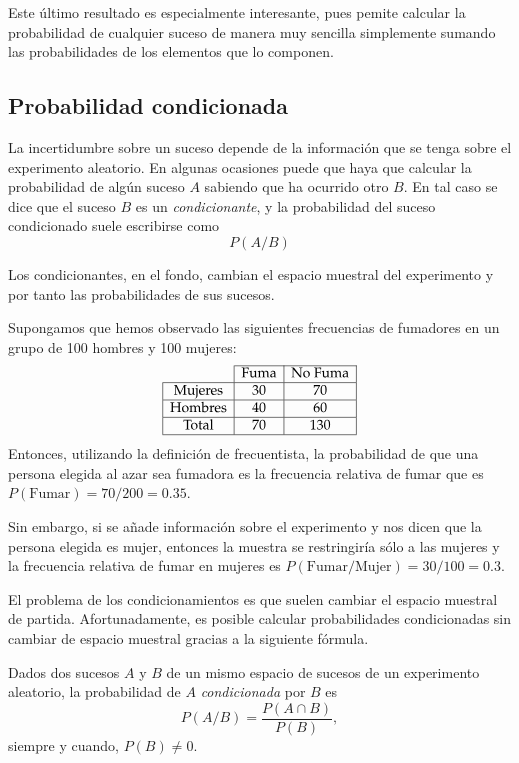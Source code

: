 Este último resultado es especialmente interesante, pues pemite calcular la probabilidad de cualquier suceso de manera muy sencilla
simplemente sumando las probabilidades de los elementos que lo componen. 

\subsection{Probabilidad condicionada}
La incertidumbre sobre un suceso depende de la información que se tenga sobre el experimento aleatorio. 
En algunas ocasiones puede que haya que calcular la probabilidad de algún suceso $A$ sabiendo que ha ocurrido otro $B$. 
En tal caso se dice que el suceso $B$ es un \emph{condicionante}, y la probabilidad del suceso condicionado suele escribirse como 
\[P(A/B)\]

Los condicionantes, en el fondo, cambian el espacio muestral del experimento y por tanto las probabilidades de sus sucesos.

\begin{ejemplo}
Supongamos que hemos observado las siguientes frecuencias de fumadores en un grupo de 100 hombres y 100 mujeres:
\[
\begin{array}{|c|c|c|}
\cline{2-3}
 \multicolumn{1}{c|}{} & \mbox{Fuma} & \mbox{No Fuma} \\ \hline 
 \mbox{Mujeres} & 30 & 70 \\ \hline
 \mbox{Hombres} & 40 & 60 \\ \hline
 \mbox{Total} & 70 & 130 \\ \hline
\end{array}
\]
Entonces, utilizando la definición de frecuentista, la probabilidad de que una persona elegida al azar sea fumadora es
la frecuencia relativa de fumar que es $P(\mbox{Fumar})= 70/200=0.35$.

Sin embargo, si se añade información sobre el experimento y nos dicen que la persona elegida es mujer, entonces la muestra se restringiría
sólo a las mujeres y la frecuencia relativa de fumar en mujeres es $P(\mbox{Fumar}/\mbox{Mujer})=30/100=0.3$. 
\end{ejemplo}

El problema de los condicionamientos es que suelen cambiar el espacio muestral de partida. 
Afortunadamente, es posible calcular probabilidades condicionadas sin cambiar de espacio muestral gracias a la siguiente fórmula.

\begin{definicion}
Dados dos sucesos $A$ y $B$ de un mismo espacio de sucesos de un experimento aleatorio, la probabilidad de $A$ \emph{condicionada} por $B$
es 
\[ P(A/B) = \frac{P(A\cap B)}{P(B)},\]
siempre y cuando, $P(B)\neq 0$.
\end{definicion}

